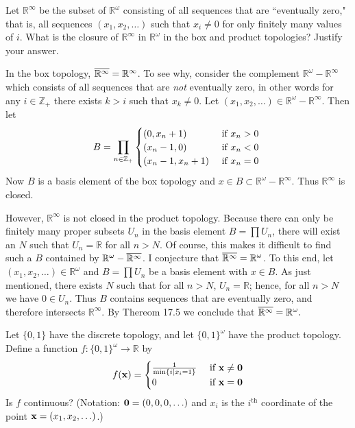 \documentclass[11pt]{article}
\begin{document}
\begin{ex}{19.7}
  Let $\mathbb{R}^\infty$ be the subset of $\mathbb{R}^\omega$ consisting of all
  sequences that are ``eventually zero," that is, all sequences $(x_1, x_2,
  \ldots)$ such that $x_i \neq 0$ for only finitely many values of $i$. What is
  the closure of $\mathbb{R}^\infty$ in $\mathbb{R}^\omega$ in the box and
  product topologies? Justify your answer.
\end{ex}

\begin{solution}
  In the box topology, ${ \overline{\mathbb{R}^\infty} } = \mathbb{R}^\infty$. To see why,
  consider the complement $\mathbb{R}^\omega - \mathbb{R}^\infty$ which consists
  of all sequences that are \emph{not} eventually zero, in other words for any
  $i \in \mathbb{Z}_+$ there exists $k > i$ such that $x_k \neq 0$. Let $(x_1,
  x_2, \ldots) \in \mathbb{R}^\omega - \mathbb{R}^\infty.$ Then let
  \[ B = \prod_{n \in \mathbb{Z}_+}
    \begin{cases}
      (0, x_n + 1) &\text{ if $ x_n > 0 $ } \\
      (x_n - 1, 0) &\text{ if $ x_n < 0 $ } \\
      (x_n - 1, x_n + 1) &\text{ if $ x_n = 0 $ }
    \end{cases}
  \]
  Now $B$ is a basis element of the box topology and $x \in B \subset
  \mathbb{R}^\omega - \mathbb{R}^\infty$. Thus $\mathbb{R}^\infty$ is closed.

  However, $\mathbb{R}^\infty$ is not closed in the product topology. Because
  there can only be finitely many proper subsets $U_n$ in the basis element $B = \prod U_n$,
  there will exist an $N$ such that $U_n = \mathbb{R}$ for all $n > N$. Of
  course, this makes it difficult to find such a $B$ contained by
  $\mathbb{R}^\omega - { \overline{\mathbb{R}^\infty} }$. I conjecture that
  ${ \overline{\mathbb{R}^\infty} } = \mathbb{R}^\omega$. To this end, let $(x_1, x_2, \ldots) \in
  \mathbb{R}^\omega$ and $B = \prod U_n$ be a basis element with $x \in B$. As
  just mentioned, there exists $N$ such that for all $n>N$, $U_n = \mathbb{R}$;
  hence, for all $n>N$ we have $0 \in U_n$. Thus $B$ contains sequences that are
  eventually zero, and therefore intersects $\mathbb{R}^\infty$. By Thereom 17.5
  we conclude that ${ \overline{\mathbb{R}^\infty} } = \mathbb{R}^\omega.$
\end{solution}


\noindent Let $\{0, 1\}$ have the discrete topology, and let $\{0, 1\}^\omega$
have the product topology. Define a function $f: \{0, 1\}^\omega \to \mathbb{R}$
by
  \[ f(\vb x) =
    \begin{cases}
      \frac{1}{\min\{i \mid x_i = 1\}} &\text{ if } \vb x \neq \vb 0 \\
      0 &\text{ if } \vb x = \vb 0
    \end{cases}
  \]
  Is $f$ continuous? (Notation: $\vb 0 = (0, 0, 0, \ldots)$ and $x_i$ is the
  $i^{\text{th}}$ coordinate of the point $\vb x = (x_1, x_2, \ldots)$.)
\end{document}
